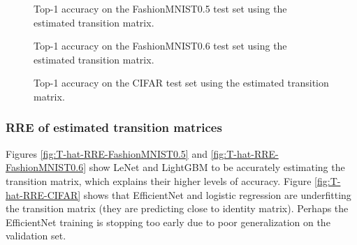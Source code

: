 \documentclass{article} %
\begin{document}
\begin{figure}\caption{
  Top-1 accuracy on the FashionMNIST0.5 test set using the estimated transition matrix.
  \label{fig:acc-hat-FashionMNIST0.5}
}\end{figure}

\begin{figure}\caption{
  Top-1 accuracy on the FashionMNIST0.6 test set using the estimated transition matrix.
  \label{fig:acc-hat-FashionMNIST0.6}
}\end{figure}

\begin{figure}\caption{
  Top-1 accuracy on the CIFAR test set using the estimated transition matrix.
  \label{fig:acc-hat-FashionMNIST0.6}
}\end{figure}


\subsubsection{RRE of estimated transition matrices}
Figures \ref{fig:T-hat-RRE-FashionMNIST0.5} and \ref{fig:T-hat-RRE-FashionMNIST0.6} show LeNet and LightGBM to be accurately estimating the transition matrix, which explains their higher levels of accuracy. Figure \ref{fig:T-hat-RRE-CIFAR} shows that EfficientNet and logistic regression are underfitting the transition matrix (they are predicting close to identity matrix). Perhaps the EfficientNet training is stopping too early due to poor generalization on the validation set.
\end{document}
